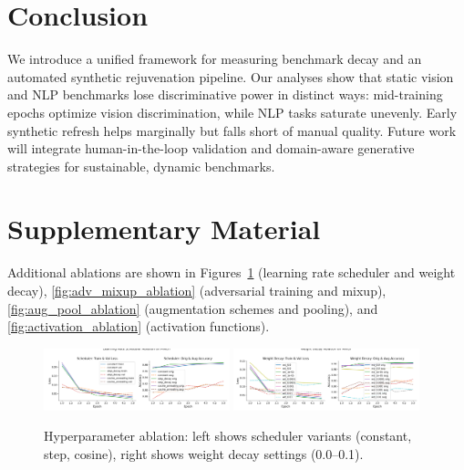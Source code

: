 \documentclass{article} %
\begin{document}
\section{Conclusion}
We introduce a unified framework for measuring benchmark decay and an automated synthetic rejuvenation pipeline. Our analyses show that static vision and NLP benchmarks lose discriminative power in distinct ways: mid-training epochs optimize vision discrimination, while NLP tasks saturate unevenly. Early synthetic refresh helps marginally but falls short of manual quality. Future work will integrate human-in-the-loop validation and domain-aware generative strategies for sustainable, dynamic benchmarks.




\appendix
\section*{Supplementary Material}
Additional ablations are shown in Figures~\ref{fig:hyperparameter_ablation} (learning rate scheduler and weight decay), \ref{fig:adv_mixup_ablation} (adversarial training and mixup), \ref{fig:aug_pool_ablation} (augmentation schemes and pooling), and \ref{fig:activation_ablation} (activation functions).

\begin{figure}[h!]
  \centering
  \includegraphics[width=0.48\textwidth]{lr_scheduler_ablation.png}
  \quad
  \includegraphics[width=0.48\textwidth]{weight_decay_ablation.png}
  \caption{Hyperparameter ablation: left shows scheduler variants (constant, step, cosine), right shows weight decay settings (0.0–0.1).}
  \label{fig:hyperparameter_ablation}
\end{figure}
\end{document}
